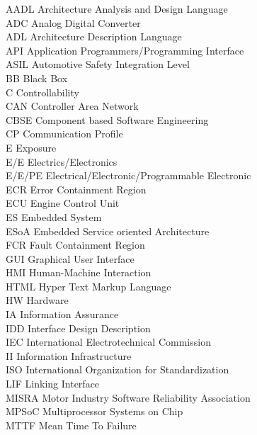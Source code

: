 AADL \tocdotfill Architecture Analysis and Design Language\\
ADC \tocdotfill Analog Digital Converter\\
ADL \tocdotfill Architecture Description Language\\
API \tocdotfill Application Programmers/Programming Interface\\
ASIL \tocdotfill Automotive Safety Integration Level\\
BB \tocdotfill Black Box\\
C \tocdotfill Controllability\\
CAN \tocdotfill Controller Area Network\\
CBSE \tocdotfill Component based Software Engineering\\
CP \tocdotfill Communication Profile\\
E \tocdotfill Exposure\\
E/E \tocdotfill Electrics/Electronics\\
E/E/PE \tocdotfill Electrical/Electronic/Programmable Electronic\\
ECR \tocdotfill Error Containment Region\\
ECU \tocdotfill Engine Control Unit\\
ES \tocdotfill Embedded System\\
ESoA \tocdotfill Embedded Service oriented Architecture\\
FCR \tocdotfill Fault Containment Region\\
GUI \tocdotfill Graphical User Interface\\
HMI \tocdotfill Human-Machine Interaction\\
HTML \tocdotfill Hyper Text Markup Language\\
HW \tocdotfill Hardware\\
IA \tocdotfill Information Assurance\\
IDD \tocdotfill Interface Design Description\\
IEC \tocdotfill International Electrotechnical Commission\\
II \tocdotfill Information Infrastructure\\
ISO \tocdotfill International Organization for Standardization\\
LIF \tocdotfill Linking Interface\\
MISRA \tocdotfill Motor Industry Software Reliability Association\\
MPSoC \tocdotfill Multiprocessor Systems on Chip\\
MTTF \tocdotfill Mean Time To Failure\\
